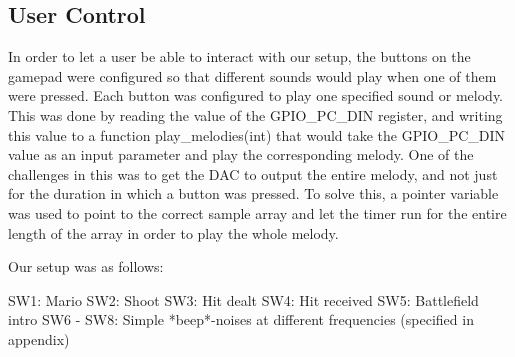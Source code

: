 \subsection{User Control}

In order to let a user be able to interact with our setup, the buttons on the gamepad were configured so that different sounds would play when one of them were pressed. Each button was configured to play one specified sound or melody. This was done by reading the value of the GPIO_PC_DIN register, and writing this value to a function play_melodies(int) that would take the GPIO_PC_DIN value as an input parameter and play the corresponding melody. One of the challenges in this was to get the DAC to output the entire melody, and not just for the duration in which a button was pressed. To solve this, a pointer variable was used to point to the correct sample array and let the timer run for the entire length of the array in order to play the whole melody.

Our setup was as follows:

SW1: Mario
SW2: Shoot
SW3: Hit dealt
SW4: Hit received
SW5: Battlefield intro
SW6 - SW8: Simple *beep*-noises at different frequencies (specified in appendix)

